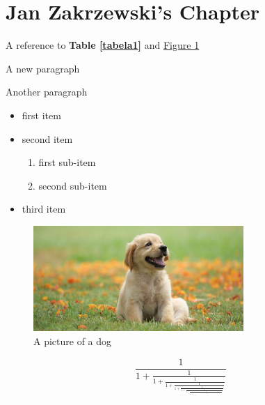 \section{Jan Zakrzewski's Chapter}

A reference to \textbf{Table \ref{tabela1}} and \underline{Figure \ref{dog2}}

A new paragraph

Another paragraph

    \begin{itemize}
        \item first item
        \item second item
    \begin{enumerate}
        \item first sub-item
        \item second sub-item
    \end{enumerate}
    
    \item third item
    
    \end{itemize}
    


\begin{figure}[h]
\centering
\includegraphics[width=8cm]{Pictures/dog2.jpg}
\caption{A picture of a dog}
\label{dog2}
\end{figure}

\begin{equation*}
    \frac{1}{1+\frac{1}{1+\frac{1}{1+\frac{1}{1+\frac{1}{1+\frac{1}{1+\frac{1}{1+\frac{1}{1+\frac{1}{1+\frac{1}{1+\frac{1}{1+\frac{1}{1+\frac{1}{1+\frac{1}{1+\frac{1}{1+\frac{1}{1+\frac{1}{1+\frac{1}{1+\frac{1}{1+\frac{1}{1+\frac{1}{1+\frac{1}{1+\frac{1}{1+\frac{1}{1+\frac{1}{1+\dots}}}}}}}}}}}}}}}}}}}}}}}}}
\end{equation*}
    
